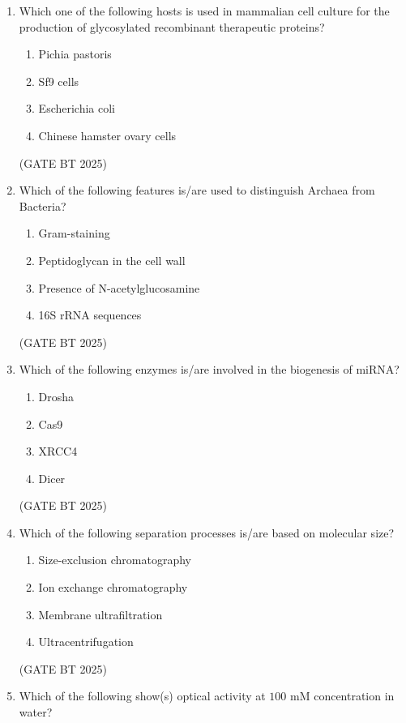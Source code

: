 \documentclass[journal,12pt,onecolumn]{IEEEtran}
\theoremstyle{remark}
\begin{document}
\begin{enumerate}
\item Which one of the following hosts is used in mammalian cell culture for the production of glycosylated recombinant therapeutic proteins?  

\begin{enumerate}
    \item Pichia pastoris
    \item Sf9 cells
    \item Escherichia coli
    \item Chinese hamster ovary cells
\end{enumerate}  
\hfill (GATE BT 2025)

\item Which of the following features is/are used to distinguish Archaea from Bacteria?  

\begin{enumerate}
    \item Gram-staining
    \item Peptidoglycan in the cell wall
    \item Presence of N-acetylglucosamine
    \item 16S rRNA sequences
\end{enumerate}  
\hfill (GATE BT 2025)

\item Which of the following enzymes is/are involved in the biogenesis of miRNA?  

\begin{enumerate}
    \item Drosha
    \item Cas9
    \item XRCC4
    \item Dicer
\end{enumerate}  
\hfill (GATE BT 2025)

\item Which of the following separation processes is/are based on molecular size?  

\begin{enumerate}
    \item Size-exclusion chromatography
    \item Ion exchange chromatography
    \item Membrane ultrafiltration
    \item Ultracentrifugation
\end{enumerate}  
\hfill (GATE BT 2025)
\item Which of the following show(s) optical activity at $100$ mM concentration in water?  


\end{enumerate}
\end{document}

